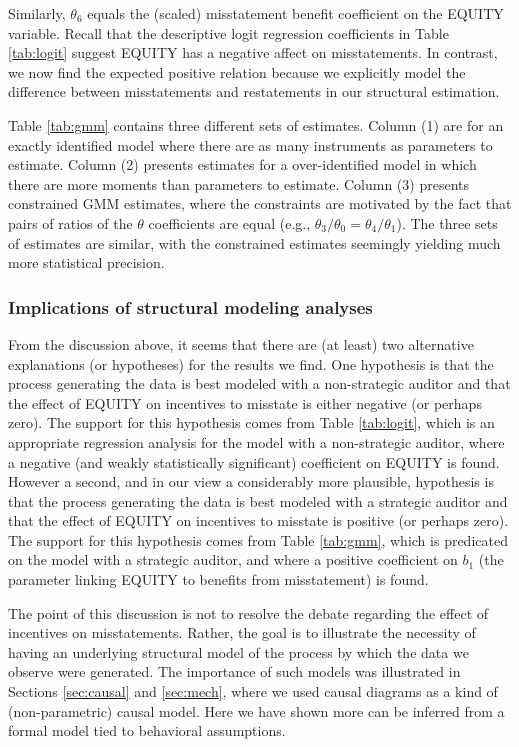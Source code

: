 Similarly, $\theta_6$ equals the (scaled) misstatement benefit coefficient on the EQUITY variable.
Recall that the descriptive logit regression coefficients in Table \ref{tab:logit} suggest EQUITY has a negative affect on misstatements.
In contrast, we now find the expected positive relation because we explicitly model the difference between misstatements and restatements in our structural estimation. 

Table \ref{tab:gmm} contains three different sets of estimates.
Column (1) are for an exactly identified model where there are as many instruments as parameters to estimate.
Column (2) presents estimates for a over-identified model in which
there are more moments than parameters to estimate.
Column (3) presents constrained GMM estimates, where the constraints are motivated by the fact that pairs of ratios of the $\theta$ coefficients are equal (e.g., $\theta_3/\theta_0
= \theta_4/\theta_1$). 
The three sets of estimates are similar, with the constrained estimates seemingly yielding
much more statistical precision.

\subsubsection{Implications of structural modeling analyses}
From the discussion above, it seems that there are (at least) two alternative explanations (or hypotheses) for the results we find.
One hypothesis is that the process generating the data is best modeled with a non-strategic auditor and that the effect of EQUITY on incentives to misstate is either negative (or perhaps zero).
The support for this hypothesis comes from Table \ref{tab:logit}, which is an appropriate regression analysis for the model with a non-strategic auditor, where a negative (and weakly statistically significant) coefficient on EQUITY is found.
However a second, and in our view a considerably more plausible, hypothesis is that the process generating the data is best modeled with a strategic auditor and that the effect of EQUITY on incentives to misstate is positive (or perhaps zero).
The support for this hypothesis comes from Table \ref{tab:gmm}, which is predicated on the model with a strategic auditor, and where a positive coefficient on $b_1$ (the parameter linking EQUITY to benefits from misstatement) is found.

The point of this discussion is not to resolve the debate regarding the effect of incentives on misstatements. 
Rather, the goal is to illustrate the necessity of having an underlying structural model of the process by which the data we observe were generated.
The importance of such models was illustrated in Sections \ref{sec:causal} and \ref{sec:mech}, where we used causal diagrams as a kind of (non-parametric) causal model.
Here we have shown more can be inferred from a formal model tied to behavioral assumptions.


